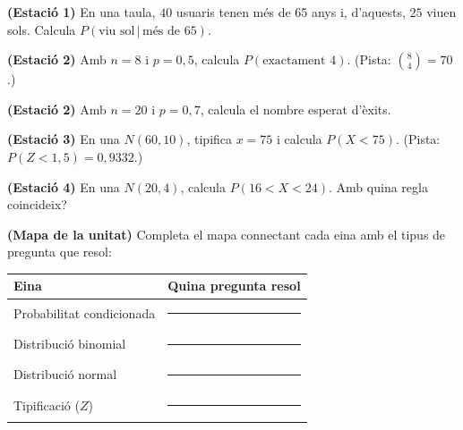 \begin{exercicis}
\begin{exlist}
  \item \textbf{(Estació 1)} En una taula, $40$ usuaris tenen més de 65 anys i,
        d'aquests, $25$ viuen sols. Calcula $P(\text{viu sol}\,|\,\text{més de 65})$.
  \item \textbf{(Estació 2)} Amb $n=8$ i $p=0,5$, calcula $P(\text{exactament }4)$.
        (Pista: $\binom{8}{4}=70$.)
  \item \textbf{(Estació 2)} Amb $n=20$ i $p=0,7$, calcula el nombre esperat d'èxits.
  \item \textbf{(Estació 3)} En una $N(60,10)$, tipifica $x=75$ i calcula $P(X<75)$.
        (Pista: $P(Z<1,5)=0,9332$.)
  \item \textbf{(Estació 4)} En una $N(20,4)$, calcula $P(16<X<24)$. Amb quina regla
        coincideix?
  \item \textbf{(Mapa de la unitat)} Completa el mapa connectant cada eina amb el tipus de
        pregunta que resol:
        \begin{center}
        \renewcommand{\arraystretch}{1.4}
        \begin{tabular}{p{4.0cm} p{8.4cm}}
        \toprule
        \textbf{Eina} & \textbf{Quina pregunta resol} \\
        \midrule
        Probabilitat condicionada & \rule{7.6cm}{0.4pt} \\
        Distribució binomial & \rule{7.6cm}{0.4pt} \\
        Distribució normal & \rule{7.6cm}{0.4pt} \\
        Tipificació ($Z$) & \rule{7.6cm}{0.4pt} \\
        \bottomrule
        \end{tabular}
        \end{center}
\end{exlist}
\end{exercicis}

